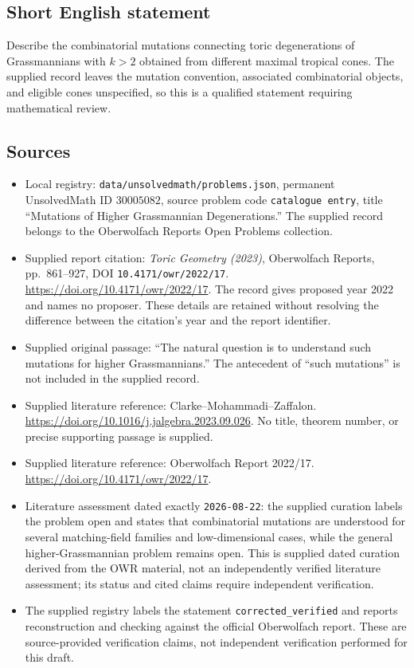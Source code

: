 \documentclass[11pt]{article}
\begin{document}
\subsection{Short English statement}
Describe the combinatorial mutations connecting toric degenerations of Grassmannians with \(k>2\) obtained from different maximal tropical cones. The supplied record leaves the mutation convention, associated combinatorial objects, and eligible cones unspecified, so this is a qualified statement requiring mathematical review.
\subsection{Sources}
\begin{itemize}
\item Local registry: \texttt{data/unsolvedmath/problems.json}, permanent UnsolvedMath ID \(30005082\), source problem code \texttt{catalogue entry}, title ``Mutations of Higher Grassmannian Degenerations.'' The supplied record belongs to the Oberwolfach Reports Open Problems collection.
\item Supplied report citation: \emph{Toric Geometry (2023)}, Oberwolfach Reports, pp.\ 861--927, DOI \texttt{10.4171/owr/2022/17}. \url{https://doi.org/10.4171/owr/2022/17}. The record gives proposed year 2022 and names no proposer. These details are retained without resolving the difference between the citation's year and the report identifier.
\item Supplied original passage: ``The natural question is to understand such mutations for higher Grassmannians.'' The antecedent of ``such mutations'' is not included in the supplied record.
\item Supplied literature reference: Clarke--Mohammadi--Zaffalon. \url{https://doi.org/10.1016/j.jalgebra.2023.09.026}. No title, theorem number, or precise supporting passage is supplied.
\item Supplied literature reference: Oberwolfach Report 2022/17. \url{https://doi.org/10.4171/owr/2022/17}.
\item Literature assessment dated exactly \texttt{2026-08-22}: the supplied curation labels the problem open and states that combinatorial mutations are understood for several matching-field families and low-dimensional cases, while the general higher-Grassmannian problem remains open. This is supplied dated curation derived from the OWR material, not an independently verified literature assessment; its status and cited claims require independent verification.
\item The supplied registry labels the statement \texttt{corrected\_verified} and reports reconstruction and checking against the official Oberwolfach report. These are source-provided verification claims, not independent verification performed for this draft.
\end{itemize}
\end{document}
